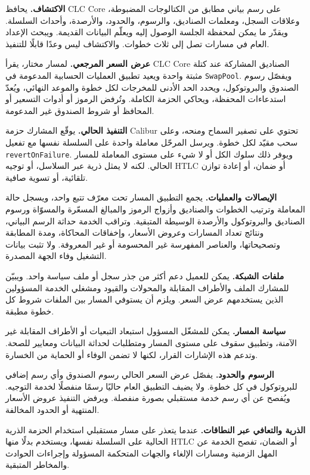 \documentclass[11pt]{article}
\begin{document}
\textbf{الاكتشاف.} يحافظ CLC Core على رسم بياني مطابق من الكتالوجات المضبوطة، وعلاقات السجل، ومعلمات الصناديق، والرسوم، والحدود، والأرصدة، وأحداث السلسلة. ويقدّر ما يمكن لمحفظة الجلسة الوصول إليه ويعلّم البيانات القديمة. ويبحث الإعداد العام في مسارات تصل إلى ثلاث خطوات. والاكتشاف ليس وعدًا قابلًا للتنفيذ.

\textbf{عرض السعر المرجعي.} لمسار مختار، يقرأ CLC Core الصناديق المشاركة عند كتلة مثبتة واحدة ويعيد تطبيق العمليات الحسابية المدعومة في \texttt{SwapPool}. ويفصّل رسوم الصندوق والبروتوكول، ويحدد الحد الأدنى للمخرجات لكل خطوة والموعد النهائي، ويُعدّ استدعاءات المحفظة، ويحاكي الحزمة الكاملة. وتُرفض الرموز أو أدوات التسعير أو المحافظ أو شروط الصندوق غير المدعومة.

\textbf{التنفيذ الحالي.} يوقّع المشارك حزمة Calibur تحتوي على تصفير السماح ومنحه، وعلى سحب مقيّد لكل خطوة. ويرسل المرحّل معاملة واحدة على السلسلة نفسها مع تفعيل \texttt{revertOnFailure}. ويوفر ذلك سلوك الكل أو لا شيء على مستوى المعاملة للمسار الحالي. لكنه لا يمثل ذرية عبر السلاسل، أو توجيه HTLC أو ضمان، أو إعادة توازن تلقائية، أو تسوية صافية.

\textbf{الإيصالات والعمليات.} يجمع التطبيق المسار تحت معرّف تتبع واحد، ويسجل حالة المعاملة وترتيب الخطوات والصناديق وأزواج الرموز والمبالغ المسعّرة والمسوّاة ورسوم الصناديق والبروتوكول والأرصدة الوسيطة المتبقية. وتراقب الخدمة حداثة الرسم البياني، ونتائج تعداد المسارات وعروض الأسعار، وإخفاقات المحاكاة، ومدة المطابقة وتصحيحاتها، والعناصر المفهرسة غير المحسومة أو غير المعروفة. ولا تثبت بيانات التشغيل وفاء الجهة المصدرة.

\textbf{ملفات الشبكة.} يمكن للعميل دعم أكثر من جذر سجل أو ملف سياسة واحد. ويبيّن للمشارك الملف والأطراف المقابلة والمحولات والقيود ومشغلي الخدمة المسؤولين الذين يستخدمهم عرض السعر. ويلزم أن يستوفي المسار بين الملفات شروط كل خطوة مطبقة.

\textbf{سياسة المسار.} يمكن للمشغّل المسؤول استبعاد التبعيات أو الأطراف المقابلة غير الآمنة، وتطبيق سقوف على مستوى المسار ومتطلبات لحداثة البيانات ومعايير للصحة. وتدعم هذه الإشارات القرار، لكنها لا تضمن الوفاء أو الحماية من الخسارة.

\textbf{الرسوم والحدود.} يفصّل عرض السعر الحالي رسوم الصندوق وأي رسم إضافي للبروتوكول في كل خطوة. ولا يضيف التطبيق العام حاليًا رسمًا منفصلًا لخدمة التوجيه. ويُفصح عن أي رسم خدمة مستقبلي بصورة منفصلة. ويرفض التنفيذ عروض الأسعار المنتهية أو الحدود المخالفة.

\textbf{الذرية والتعافي عبر النطاقات.} عندما يتعذر على مسار مستقبلي استخدام الحزمة الذرية الحالية على السلسلة نفسها، ويستخدم بدلًا منها HTLC أو الضمان، تفصح الخدمة عن المهل الزمنية ومسارات الإلغاء والجهات المتحكمة المسؤولة وإجراءات الحوادث والمخاطر المتبقية.
\end{document}
